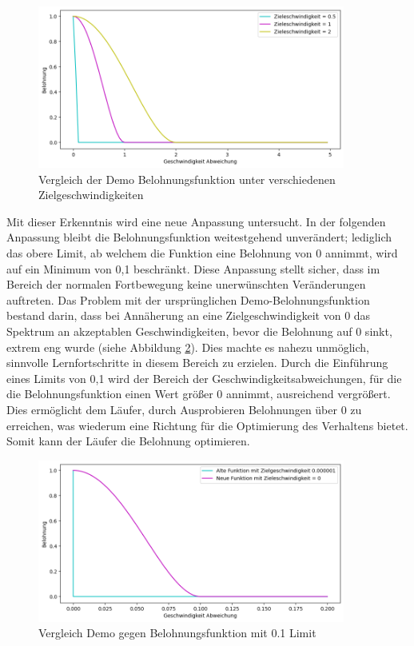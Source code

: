 \begin{figure}[H]
  \centering  
  \includegraphics[width=0.9\textwidth]{img/match_velocity_demo_vergleich}
  \caption{Vergleich der Demo Belohnungsfunktion unter verschiedenen Zielgeschwindigkeiten}
  \label{fig:match_velocity_demo_vergleich}
\end{figure}

Mit dieser Erkenntnis wird eine neue Anpassung untersucht. In der folgenden Anpassung bleibt die Belohnungsfunktion weitestgehend unverändert; lediglich das obere Limit, ab welchem die Funktion eine Belohnung von 0 annimmt, wird auf ein Minimum von 0,1 beschränkt. Diese Anpassung stellt sicher, dass im Bereich der normalen Fortbewegung keine unerwünschten Veränderungen auftreten. Das Problem mit der ursprünglichen Demo-Belohnungsfunktion bestand darin, dass bei Annäherung an eine Zielgeschwindigkeit von 0 das Spektrum an akzeptablen Geschwindigkeiten, bevor die Belohnung auf 0 sinkt, extrem eng wurde (siehe Abbildung \ref{fig:match_velocity_vergleich_clip}). Dies machte es nahezu unmöglich, sinnvolle Lernfortschritte in diesem Bereich zu erzielen. Durch die Einführung eines Limits von 0,1 wird der Bereich der Geschwindigkeitsabweichungen, für die die Belohnungsfunktion einen Wert größer 0 annimmt, ausreichend vergrößert. Dies ermöglicht dem Läufer, durch Ausprobieren Belohnungen über 0 zu erreichen, was wiederum eine Richtung für die Optimierung des Verhaltens bietet. Somit kann der Läufer die Belohnung optimieren.

\begin{figure}[H]
  \centering  
  \includegraphics[width=0.9\textwidth]{img/match_velocity_vergleich_clip}
  \caption{Vergleich Demo gegen Belohnungsfunktion mit 0.1 Limit}
  \label{fig:match_velocity_vergleich_clip}
\end{figure}

